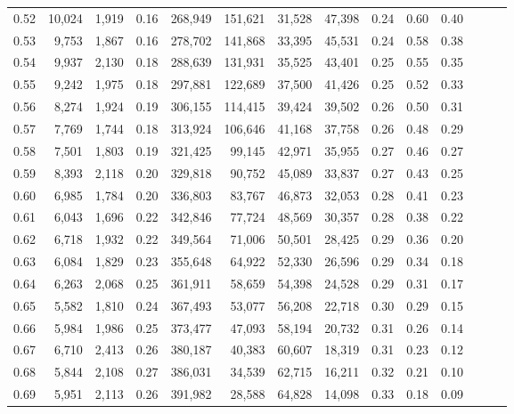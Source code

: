 \begin{tabular}{rrrrrrrrrrrrrr}
0.52 &  10,024 &  1,919 &  0.16 &  268,949 &  151,621 &  31,528 &  47,398 &  0.24 &  0.60 &      0.40 \\
0.53 &   9,753 &  1,867 &  0.16 &  278,702 &  141,868 &  33,395 &  45,531 &  0.24 &  0.58 &      0.38 \\
0.54 &   9,937 &  2,130 &  0.18 &  288,639 &  131,931 &  35,525 &  43,401 &  0.25 &  0.55 &      0.35 \\
0.55 &   9,242 &  1,975 &  0.18 &  297,881 &  122,689 &  37,500 &  41,426 &  0.25 &  0.52 &      0.33 \\
0.56 &   8,274 &  1,924 &  0.19 &  306,155 &  114,415 &  39,424 &  39,502 &  0.26 &  0.50 &      0.31 \\
0.57 &   7,769 &  1,744 &  0.18 &  313,924 &  106,646 &  41,168 &  37,758 &  0.26 &  0.48 &      0.29 \\
0.58 &   7,501 &  1,803 &  0.19 &  321,425 &   99,145 &  42,971 &  35,955 &  0.27 &  0.46 &      0.27 \\
0.59 &   8,393 &  2,118 &  0.20 &  329,818 &   90,752 &  45,089 &  33,837 &  0.27 &  0.43 &      0.25 \\
0.60 &   6,985 &  1,784 &  0.20 &  336,803 &   83,767 &  46,873 &  32,053 &  0.28 &  0.41 &      0.23 \\
0.61 &   6,043 &  1,696 &  0.22 &  342,846 &   77,724 &  48,569 &  30,357 &  0.28 &  0.38 &      0.22 \\
0.62 &   6,718 &  1,932 &  0.22 &  349,564 &   71,006 &  50,501 &  28,425 &  0.29 &  0.36 &      0.20 \\
0.63 &   6,084 &  1,829 &  0.23 &  355,648 &   64,922 &  52,330 &  26,596 &  0.29 &  0.34 &      0.18 \\
0.64 &   6,263 &  2,068 &  0.25 &  361,911 &   58,659 &  54,398 &  24,528 &  0.29 &  0.31 &      0.17 \\
0.65 &   5,582 &  1,810 &  0.24 &  367,493 &   53,077 &  56,208 &  22,718 &  0.30 &  0.29 &      0.15 \\
0.66 &   5,984 &  1,986 &  0.25 &  373,477 &   47,093 &  58,194 &  20,732 &  0.31 &  0.26 &      0.14 \\
0.67 &   6,710 &  2,413 &  0.26 &  380,187 &   40,383 &  60,607 &  18,319 &  0.31 &  0.23 &      0.12 \\
0.68 &   5,844 &  2,108 &  0.27 &  386,031 &   34,539 &  62,715 &  16,211 &  0.32 &  0.21 &      0.10 \\
0.69 &   5,951 &  2,113 &  0.26 &  391,982 &   28,588 &  64,828 &  14,098 &  0.33 &  0.18 &      0.09 \\

\end{tabular}
